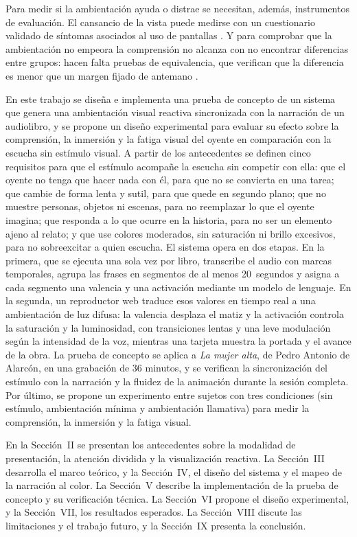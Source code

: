 \documentclass[journal]{IEEEtran}
\begin{document}
Para medir si la ambientación ayuda o distrae se necesitan, además, instrumentos de evaluación. El cansancio de la vista puede medirse con un cuestionario validado de síntomas asociados al uso de pantallas \cite{segui2015}. Y para comprobar que la ambientación no empeora la comprensión no alcanza con no encontrar diferencias entre grupos: hacen falta pruebas de equivalencia, que verifican que la diferencia es menor que un margen fijado de antemano \cite{lakens2017}.

En este trabajo se diseña e implementa una prueba de concepto de un sistema que genera una ambientación visual reactiva sincronizada con la narración de un audiolibro, y se propone un diseño experimental para evaluar su efecto sobre la comprensión, la inmersión y la fatiga visual del oyente en comparación con la escucha sin estímulo visual. A partir de los antecedentes se definen cinco requisitos para que el estímulo acompañe la escucha sin competir con ella: que el oyente no tenga que hacer nada con él, para que no se convierta en una tarea; que cambie de forma lenta y sutil, para que quede en segundo plano; que no muestre personas, objetos ni escenas, para no reemplazar lo que el oyente imagina; que responda a lo que ocurre en la historia, para no ser un elemento ajeno al relato; y que use colores moderados, sin saturación ni brillo excesivos, para no sobreexcitar a quien escucha. El sistema opera en dos etapas. En la primera, que se ejecuta una sola vez por libro, transcribe el audio con marcas temporales, agrupa las frases en segmentos de al menos 20~segundos y asigna a cada segmento una valencia y una activación mediante un modelo de lenguaje. En la segunda, un reproductor web traduce esos valores en tiempo real a una ambientación de luz difusa: la valencia desplaza el matiz y la activación controla la saturación y la luminosidad, con transiciones lentas y una leve modulación según la intensidad de la voz, mientras una tarjeta muestra la portada y el avance de la obra. La prueba de concepto se aplica a \textit{La mujer alta}, de Pedro Antonio de Alarcón, en una grabación de 36 minutos, y se verifican la sincronización del estímulo con la narración y la fluidez de la animación durante la sesión completa. Por último, se propone un experimento entre sujetos con tres condiciones (sin estímulo, ambientación mínima y ambientación llamativa) para medir la comprensión, la inmersión y la fatiga visual.

En la Sección~II se presentan los antecedentes sobre la modalidad de presentación, la atención dividida y la visualización reactiva. La Sección~III desarrolla el marco teórico, y la Sección~IV, el diseño del sistema y el mapeo de la narración al color. La Sección~V describe la implementación de la prueba de concepto y su verificación técnica. La Sección~VI propone el diseño experimental, y la Sección~VII, los resultados esperados. La Sección~VIII discute las limitaciones y el trabajo futuro, y la Sección~IX presenta la conclusión.
\end{document}
